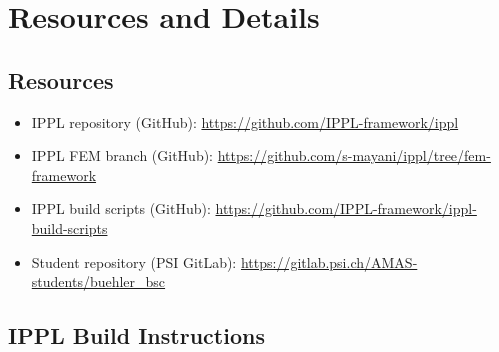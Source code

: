 

\chapter{Resources and Details}

\section{Resources}

\begin{itemize}
    \item IPPL repository (GitHub): \href{https://github.com/IPPL-framework/ippl}{https://github.com/IPPL-framework/ippl}
    \item IPPL FEM branch (GitHub): \href{https://github.com/s-mayani/ippl/tree/fem-framework}{https://github.com/s-mayani/ippl/tree/fem-framework}
    \item IPPL build scripts (GitHub): \href{https://github.com/IPPL-framework/ippl-build-scripts}{https://github.com/IPPL-framework/ippl-build-scripts}
    \item Student repository (PSI GitLab): \href{https://gitlab.psi.ch/AMAS-students/buehler\_bsc}{https://gitlab.psi.ch/AMAS-students/buehler\_bsc}
\end{itemize}

\section{IPPL Build Instructions}


